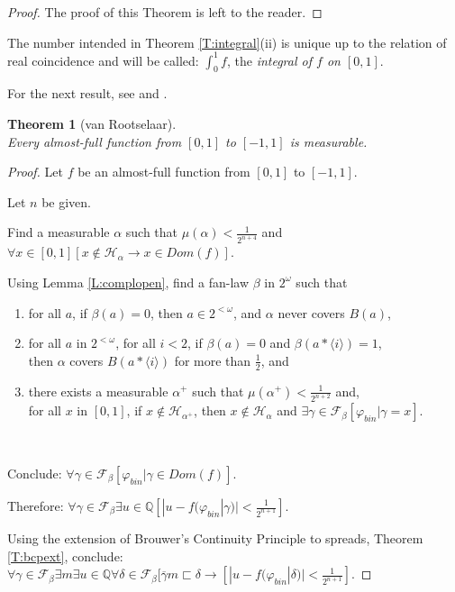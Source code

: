 \documentclass[a4paper]{amsart}
\theoremstyle{plain}
\newtheorem{theorem}{Theorem}
\begin{document}
\begin{proof} The proof of this Theorem is left to the reader. \end{proof}
The number intended in Theorem \ref{T:integral}(ii) is unique up to the relation of real coincidence and will be called: $\int_0^1f$, the {\it integral of $f$ on $[0,1]$}. 
 
 For the next result, see \cite[page 7]{rootselaar54} and \cite[Section 6.2.2, Theorem 1]{heyting56}.
 
 \begin{theorem}[van Rootselaar]$\;$\\ Every almost-full function from $[0,1]$ to $[-1,1]$ is measurable. \end{theorem}
 
 \begin{proof} Let $f$ be an almost-full function from $[0,1]$ to $[-1,1]$. 
 
 Let $n$ be given. 
 
 Find a measurable $\alpha$ such that $\mu(\alpha)<\frac{1}{2^{n+4}}$ and \\$\forall x \in [0,1][x\notin\mathcal{H}_\alpha\rightarrow x \in Dom(f)]$. 
 
 Using Lemma \ref{L:complopen}, find a fan-law $\beta$ in $2^\omega$ such that \begin{enumerate} \item for all $a$, if $\beta(a)=0$, then $a \in 2^{<\omega}$, and $\alpha$ never covers $B(a)$,  \item  for all $a$ in $2^{<\omega}$, for all $i<2$, if $\beta(a)= 0$ and $\beta(a\ast\langle i \rangle)=1$, \\then $\alpha$ covers $B(a\ast \langle i \rangle)$ for more than $\frac{1}{2}$, and \item there exists a measurable $\alpha^+$ such that  $\mu(\alpha^+)<\frac{1}{2^{n+2}}$ and, \\for all $x$ in $[0,1]$, if $x\notin \mathcal{H}_{\alpha^+}$, then  $x \notin \mathcal{H}_\alpha$ and $\exists \gamma \in \mathcal{F}_\beta[\varphi_{bin}|\gamma = x]$. \end{enumerate}\
 
\smallskip  Conclude: $\forall \gamma \in \mathcal{F}_\beta[\varphi_{bin}|\gamma \in Dom(f)]$. 

\smallskip Therefore: $\forall \gamma \in \mathcal{F}_\beta  \exists u \in \mathbb{Q}[|u-f(\varphi_{bin}|\gamma)|<\frac{1}{2^{n+1}}]$. 

\smallskip Using the extension of Brouwer's Continuity Principle to spreads, Theorem \ref{T:bcpext}, conclude: $\forall \gamma \in \mathcal{F}_\beta  \exists m\exists u \in \mathbb{Q}\forall \delta \in \mathcal{F}_\beta[ \overline \gamma m \sqsubset \delta\rightarrow [|u-f(\varphi_{bin}|\delta)|<\frac{1}{2^{n+1}}]$.  


\end{proof}
\end{document}
